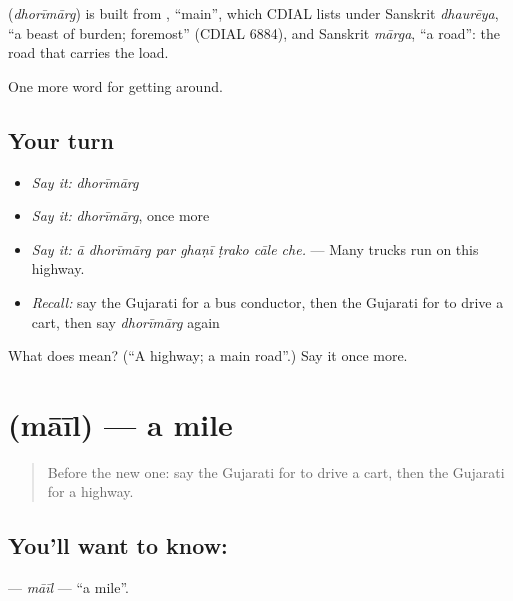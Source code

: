 \begin{cousinweb}
\textbf{} (\emph{dhorīmārg}) is built from , \textquotedblleft{}main\textquotedblright{}, which CDIAL lists under Sanskrit \emph{dhaurēya}, \textquotedblleft{}a beast of burden; foremost\textquotedblright{} (CDIAL 6884), and Sanskrit \emph{mārga}, \textquotedblleft{}a road\textquotedblright{}: the road that carries the load.
\end{cousinweb}

\begin{grammarlens}[title={What you've built}]
One more word for getting around.
\end{grammarlens}

\subsection*{Your turn}
\begin{itemize}
\raggedright
  \item \emph{Say it:} \emph{dhorīmārg}
  \item \emph{Say it:} \emph{dhorīmārg}, once more
  \item \emph{Say it:} \emph{ā dhorīmārg par ghaṇī ṭrako cāle che.} — Many trucks run on this highway.
  \item \emph{Recall:} say the Gujarati for a bus conductor, then the Gujarati for to drive a cart, then say \emph{dhorīmārg} again
\end{itemize}

\begin{tcolorbox}[breakable,colback=teal!4,colframe=teal!35!black,title={Before you move on}]
What does  mean? (\textquotedblleft{}A highway; a main road\textquotedblright{}.) Say it once more.
\end{tcolorbox}
\section[\texorpdfstring{\gu{માઈલ} (māīl)}{માઈલ (māīl)}]{ (māīl) — a mile}

\label{lesson:GU-C403-mail}



\begin{quote}
Before the new one: say the Gujarati for to drive a cart, then the Gujarati for a highway.
\end{quote}

\subsection*{You'll want to know: }
\textbf{} — \emph{māīl} — \textquotedblleft{}a mile\textquotedblright{}.

